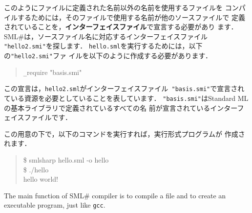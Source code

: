 \documentclass{jbook}
\newcommand{\smlsharp}{SML\#}
\newenvironment{program}{\begin{quote}\begin{tt}}%
                        {\end{tt}\end{quote}}
\begin{document}
	このようにファイルに定義された名前以外の名前を使用するファイルを
コンパイルするためには，そのファイルで使用する名前が他のソースファイルで
定義されていることを，{\bf インターフェイスファイル}で宣言する必要があり
ます． 
	\smlsharp{}は，ソースファイル名に対応するインターフェイスファイル
{\tt "hello2.smi"}を探します．
	{\tt hello.sml}を実行するためには，以下の{\tt "hello2.smi"}ファ
イルを以下のように作成する必要があります．
\begin{program}
\verb|_|require "basis.smi"
\end{program}
	この宣言は，{\tt hello2.sml}がインターフェイスファイル{\tt
"basis.smi"}で宣言されている資源を必要としていることを表しています．
{\tt "basis.smi"}はStandard MLの基本ライブラリで定義されているすべての名
前が宣言されているインターフェイスファイルです．

	この用意の下で，以下のコマンドを実行すれば，実行形式プログラムが
作成されます．
\begin{program}
\$ smlsharp hello.sml -o hello\\
\$ ./hello\\
hello world!
\end{program}
\else%
	The main function of \smlsharp{} compiler  is to compile a file
and to create an executable program, just like {\tt gcc}.
\end{document}
